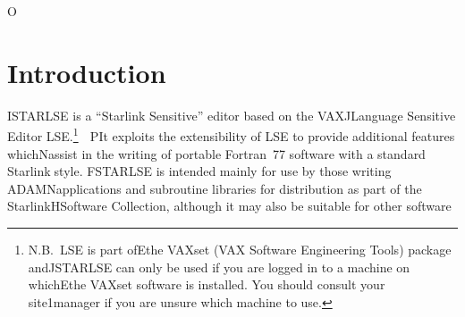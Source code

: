  \vspace{20mm}   O %
 \vspace{30mm}    \section{Introduction}  I \mbox{STARLSE} is a ``Starlink Sensitive'' editor based on the \mbox{VAX} J Language Sensitive Editor \mbox{LSE}.\footnote{N.B.\ \mbox{LSE} is part ofE the \mbox{VAXset} (\mbox{VAX} Software Engineering Tools) package and J \mbox{STARLSE} can only be used if you are logged in to a machine on whichE the \mbox{VAXset} software is installed. You should consult your site 1 manager if you are unsure which machine to use.}     P It exploits the extensibility of \mbox{LSE} to provide additional features whichN assist in the writing of portable Fortran~77 software with a standard Starlink style.  F \mbox{STARLSE} is intended mainly for use by those writing \mbox{ADAM}N applications and subroutine libraries for distribution as part of the StarlinkH Software Collection, although it may also be suitable for other software
